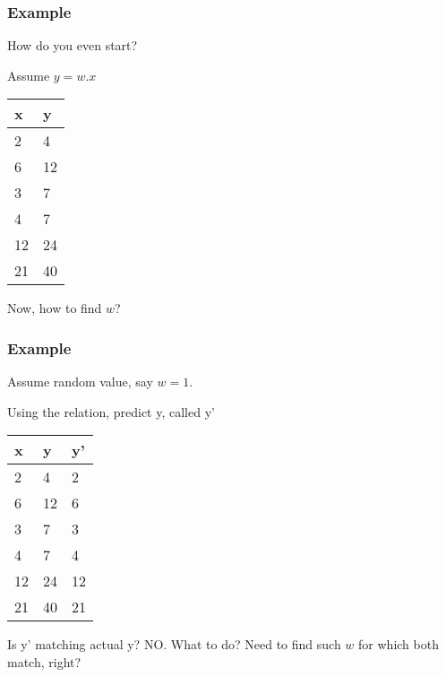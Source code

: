 \begin{frame}[fragile]\frametitle{Example}

How do you even start?

Assume $ y = w.x$ 

	\begin{table}[!h]
		\centering
		\begin{tabular}{| l | l |}
			\hline
			x & y \\ \hline
			2 & 4 \\ \hline
			6 & 12 \\ \hline
			3 & 7 \\ \hline
			4 & 7 \\ \hline
			12 & 24 \\ \hline
			21 & 40 \\ \hline			
		\end{tabular}
\end{table}

Now, how to find $w$?

\end{frame}

\begin{frame}[fragile]\frametitle{Example}

Assume random value, say $w = 1$.

Using the relation, predict y, called y'

	\begin{table}[!h]
		\centering
		\begin{tabular}{| l | l | l|}
			\hline
			x & y & y'\\ \hline
			2 & 4  & 2\\ \hline
			6 & 12 & 6\\ \hline
			3 & 7  & 3\\ \hline
			4 & 7 & 4\\ \hline
			12 & 24 & 12\\ \hline
			21 & 40 & 21\\ \hline			
		\end{tabular}
\end{table}

Is y' matching actual y? NO. What to do? Need to find such $w$ for which both match, right?

\end{frame}

